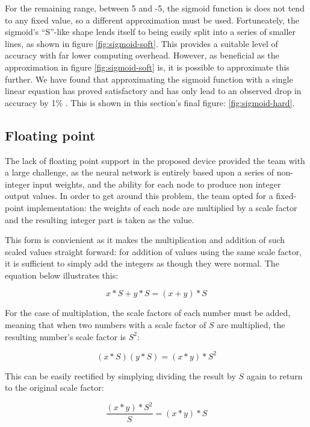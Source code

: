 For the remaining range, between 5 and -5, the sigmoid function is does not tend to any fixed value, so a different approximation must be used. Fortuneately, the sigmoid's ``S''-like shape lends itself to being easily split into a series of smaller lines, as shown in figure \ref{fig:sigmoid-soft}. This provides a suitable level of accuracy with far lower computing overhead. However, as beneficial as the approximation in figure \ref{fig:sigmoid-soft} is, it is possible to approximate this further. We have found that approximating the sigmoid function with a single
linear equation has proved satisfactory and has only lead to an observed drop in accuracy by 1\% . This is shown in this section's final figure: \ref{fig:sigmoid-hard}.

\subsection{Floating point}
The lack of floating point support in the proposed device provided the team with a large challenge, as the neural network is entirely based upon a series of non-integer input weights, and the ability for each node to produce non integer output values. In order to get around this problem, the team opted for a fixed-point implementation: the weights of each node are multiplied by a scale factor and the resulting integer part is taken as the value.

This form is convienient as it makes the multiplication and addition of such scaled values straight forward: for addition of values using the same scale factor, it is sufficient to simply add the integers as though they were normal. The equation below illustrates this:

\begin{equation}
\label{eq:bits:addition}
x*S+y*S=(x+y)*S
\end{equation}

For the case of multiplation, the scale factors of each number must be added, meaning that when two numbers with a scale factor of $S$ are multiplied, the resulting number's scale factor is $S^2$:

\begin{equation}
\label{eq:bits:multiplication}
(x*S)(y*S)=(x*y)*S^2
\end{equation}

This can be easily rectified by simplying dividing the result by $S$ again to return to the original scale factor:

\begin{equation}
\label{eq:bits:rescale}
\frac{(x*y)*S^2}{S}=(x*y)*S
\end{equation}

